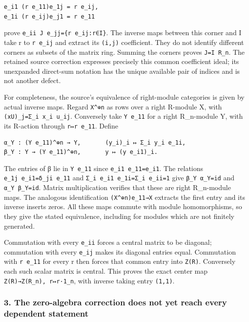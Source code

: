 \documentclass[11pt]{article}
\begin{document}
\begin{verbatim}
e_i1 (r e_11)e_1j = r e_ij,
e_1i (r e_ij)e_j1 = r e_11
\end{verbatim}

prove \texttt{e\_ii\ J\ e\_jj=\{r\ e\_ij:r∈I\}}. The inverse maps between this corner and I take r to \texttt{r\ e\_ij} and extract its \texttt{(i,j)} coefficient. They do not identify different corners as subsets of the matrix ring. Summing the corners proves \texttt{J=I\ R\_n}. The retained source correction expresses precisely this common coefficient ideal; its unexpanded direct-sum notation has the unique available pair of indices and is not another defect.

For completeness, the source's equivalence of right-module categories is given by actual inverse maps. Regard \texttt{X\^{}⊕n} as rows over a right R-module X, with \texttt{(xU)\_j=Σ\_i\ x\_i\ u\_ij}. Conversely take \texttt{Y\ e\_11} for a right R\_n-module Y, with its R-action through \texttt{r↦r\ e\_11}. Define

\begin{verbatim}
α_Y : (Y e_11)^⊕n → Y,       (y_i)_i ↦ Σ_i y_i e_1i,
β_Y : Y → (Y e_11)^⊕n,       y ↦ (y e_i1)_i.
\end{verbatim}

The entries of β lie in \texttt{Y\ e\_11} since \texttt{e\_i1\ e\_11=e\_i1}. The relations \texttt{e\_1j\ e\_i1=δ\_ji\ e\_11} and \texttt{Σ\_i\ e\_i1\ e\_1i=Σ\_i\ e\_ii=1} give \texttt{β\_Y\ α\_Y=id} and \texttt{α\_Y\ β\_Y=id}. Matrix multiplication verifies that these are right R\_n-module maps. The analogous identification \texttt{(X\^{}⊕n)e\_11→X} extracts the first entry and its inverse inserts zeros. All these maps commute with module homomorphisms, so they give the stated equivalence, including for modules which are not finitely generated.

Commutation with every \texttt{e\_ii} forces a central matrix to be diagonal; commutation with every \texttt{e\_ij} makes its diagonal entries equal. Commutation with \texttt{r\ e\_11} for every r then forces that common entry into \texttt{Z(R)}. Conversely each such scalar matrix is central. This proves the exact center map \texttt{Z(R)→Z(R\_n),\ r↦r·1\_n}, with inverse taking entry \texttt{(1,1)}.

\subsubsection{3. The zero-algebra correction does not yet reach every dependent statement}\label{the-zero-algebra-correction-does-not-yet-reach-every-dependent-statement}
\end{document}
